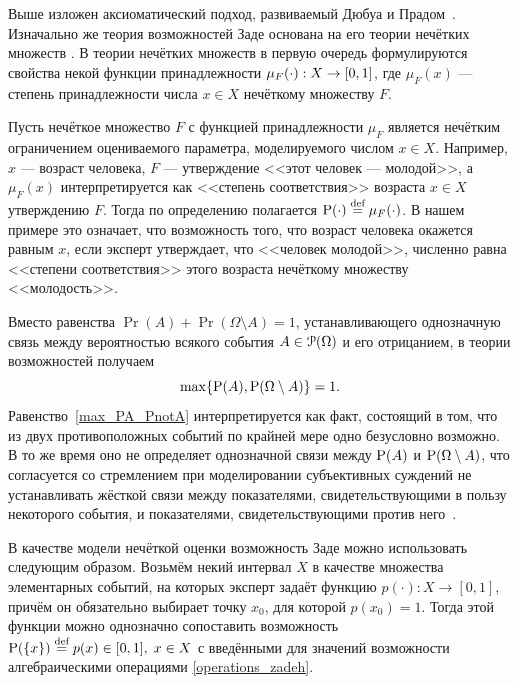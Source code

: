 \begin{notice}
Выше изложен аксиоматический подход, развиваемый Дюбуа и Прадом~\cite{dubois_prade-1990}. Изначально же теория возможностей Заде основана на его теории нечётких множеств \cite{ZadehPrime}. В теории нечётких множеств в первую очередь формулируются свойства некой функции принадлежности $\mu_{F}(\cdot): X \rightarrow \zo$, где $\mu_F(x)$ --- степень принадлежности числа $x \in X$ нечёткому множеству $F$. 

Пусть нечёткое множество $F$ с функцией принадлежности $\mu_{F}$ является нечётким ограничением \cite{citeZadeh} оцениваемого параметра, моделируемого числом $x \in X$. Например, $x$ --- возраст человека, $F$ --- утверждение <<этот человек --- молодой>>, а $\mu_{F}(x)$ интерпретируется как <<степень соответствия>> возраста $x \in X$ утверждению $F$. Тогда по определению полагается $\P(\cdot) \defeq \mu_{F}(\cdot)$. В нашем примере это означает, что возможность того, что возраст человека окажется равным $x$, если эксперт утверждает, что <<человек молодой>>, численно равна <<степени соответствия>> этого возраста нечёткому множеству <<молодость>>. 
\end{notice}
\begin{notice}
Вместо равенства $\Pr(A) + \Pr(\Omega\setminus A) = 1$, устанавливающего однозначную связь между вероятностью всякого события $A\in\Po(\Omega)$ и его отрицанием, в теории возможностей получаем
\begin{equation}
\label{max_PA_PnotA}
    \max\{\P(A), \P(\Omega\setminus A)\} = 1.
\end{equation}
Равенство~\eqref{max_PA_PnotA} интерпретируется как факт, состоящий в том, что из двух противоположных событий по крайней мере одно безусловно возможно. В то же время оно не определяет однозначной связи между $\P(A)$ и $\P(\Omega\setminus A)$, что согласуется со стремлением при моделировании субъективных суждений не устанавливать жёсткой связи между показателями, свидетельствующими в пользу некоторого события, и показателями, свидетельствующими против него~\cite{dubois_prade-1990}.
\end{notice}

\label{zadeh_fuzzy_asset_alg}
В качестве модели нечёткой оценки возможность Заде можно использовать следующим образом. Возьмём некий интервал $X$ в качестве множества элементарных событий, на которых эксперт задаёт функцию $p(\cdot): X \rightarrow [0,1]$, причём он обязательно выбирает точку $x_0$, для которой $p(x_0) = 1$. Тогда этой функции можно однозначно сопоставить возможность $\P(\{x\}) \define= p(x) \in \zo,\; x\in X$ с введёнными для значений возможности алгебраическими операциями \eqref{operations_zadeh}. 

